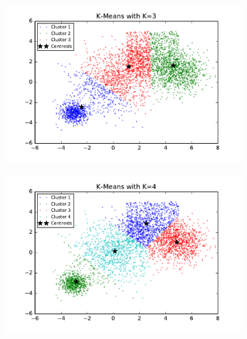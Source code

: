 \begin{description}
\begin{figure}[htb]
        \centering
        \begin{subfigure}[b]{0.475\textwidth}
            \centering
            \includegraphics[width=\textwidth]{./figures/bigClustering_kMeans_3.pdf}
        \end{subfigure}
        \hfill
        \begin{subfigure}[b]{0.475\textwidth}  
            \centering 
            \includegraphics[width=\textwidth]{./figures/bigClustering_kMeans_4.pdf}
        \end{subfigure}
        \begin{subfigure}[b]{0.475\textwidth}  
            \centering 

\end{subfigure}
\end{figure}
\end{description}
